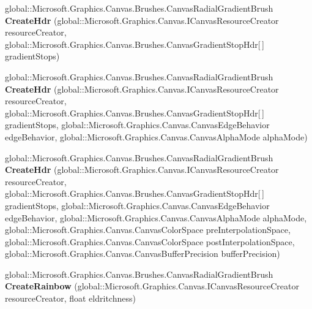 \begin{DoxyCompactItemize}
global\+::\+Microsoft.\+Graphics.\+Canvas.\+Brushes.\+Canvas\+Radial\+Gradient\+Brush {\bfseries Create\+Hdr} (global\+::\+Microsoft.\+Graphics.\+Canvas.\+I\+Canvas\+Resource\+Creator resource\+Creator, global\+::\+Microsoft.\+Graphics.\+Canvas.\+Brushes.\+Canvas\+Gradient\+Stop\+Hdr\mbox{[}$\,$\mbox{]} gradient\+Stops)
\item 
\mbox{\label{interface_microsoft_1_1_graphics_1_1_canvas_1_1_brushes_1_1_i_canvas_radial_gradient_brush_statics_aa2aa4c9e128daa190430d9e6057029c7}} 
global\+::\+Microsoft.\+Graphics.\+Canvas.\+Brushes.\+Canvas\+Radial\+Gradient\+Brush {\bfseries Create\+Hdr} (global\+::\+Microsoft.\+Graphics.\+Canvas.\+I\+Canvas\+Resource\+Creator resource\+Creator, global\+::\+Microsoft.\+Graphics.\+Canvas.\+Brushes.\+Canvas\+Gradient\+Stop\+Hdr\mbox{[}$\,$\mbox{]} gradient\+Stops, global\+::\+Microsoft.\+Graphics.\+Canvas.\+Canvas\+Edge\+Behavior edge\+Behavior, global\+::\+Microsoft.\+Graphics.\+Canvas.\+Canvas\+Alpha\+Mode alpha\+Mode)
\item 
\mbox{\label{interface_microsoft_1_1_graphics_1_1_canvas_1_1_brushes_1_1_i_canvas_radial_gradient_brush_statics_a86665bd26bca12d2ecfcc18dc1a6ae1a}} 
global\+::\+Microsoft.\+Graphics.\+Canvas.\+Brushes.\+Canvas\+Radial\+Gradient\+Brush {\bfseries Create\+Hdr} (global\+::\+Microsoft.\+Graphics.\+Canvas.\+I\+Canvas\+Resource\+Creator resource\+Creator, global\+::\+Microsoft.\+Graphics.\+Canvas.\+Brushes.\+Canvas\+Gradient\+Stop\+Hdr\mbox{[}$\,$\mbox{]} gradient\+Stops, global\+::\+Microsoft.\+Graphics.\+Canvas.\+Canvas\+Edge\+Behavior edge\+Behavior, global\+::\+Microsoft.\+Graphics.\+Canvas.\+Canvas\+Alpha\+Mode alpha\+Mode, global\+::\+Microsoft.\+Graphics.\+Canvas.\+Canvas\+Color\+Space pre\+Interpolation\+Space, global\+::\+Microsoft.\+Graphics.\+Canvas.\+Canvas\+Color\+Space post\+Interpolation\+Space, global\+::\+Microsoft.\+Graphics.\+Canvas.\+Canvas\+Buffer\+Precision buffer\+Precision)
\item 
\mbox{\label{interface_microsoft_1_1_graphics_1_1_canvas_1_1_brushes_1_1_i_canvas_radial_gradient_brush_statics_a7dd980a2771ddc006a4a8a3c925e1be7}} 
global\+::\+Microsoft.\+Graphics.\+Canvas.\+Brushes.\+Canvas\+Radial\+Gradient\+Brush {\bfseries Create\+Rainbow} (global\+::\+Microsoft.\+Graphics.\+Canvas.\+I\+Canvas\+Resource\+Creator resource\+Creator, float eldritchness)

\end{DoxyCompactItemize}
